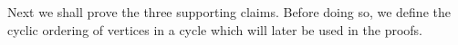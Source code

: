 \documentclass[10pt,a4paper]{article}
\newcommand{\prettyref}[1]{\cref{#1}}
\theoremstyle{definition}
\newtheorem{definition}[theorem]{Definition}
\theoremstyle{remark}
\newtheorem{claim}[theorem]{Claim}
\numberwithin{equation}{section}
\let\pref=\prettyref
\begin{document}







Next we shall prove the three supporting claims. Before doing so,  we define the cyclic ordering of vertices in a cycle which will later be used in the proofs.

\end{document}
